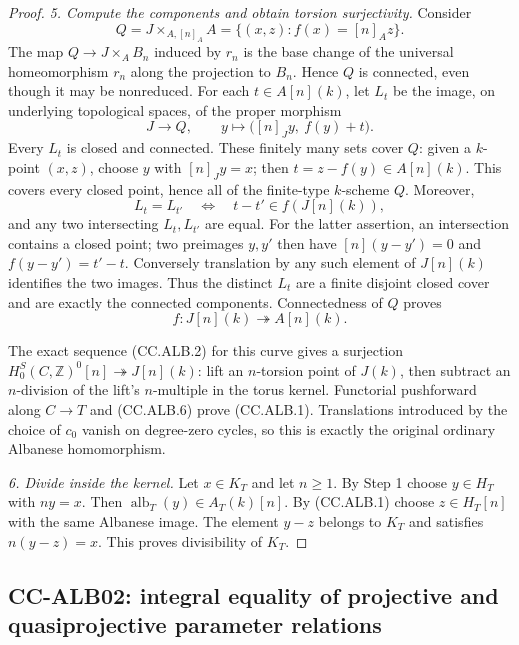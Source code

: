 \documentclass[11pt,a4paper]{article}
\theoremstyle{definition}\newtheorem{definition}[theorem]{Definition}
\theoremstyle{remark}\newtheorem{remark}[theorem]{Remark}
\begin{document}
\begin{proof}
\emph{5. Compute the components and obtain torsion
surjectivity.}
Consider
\[
 Q=J\times_{A,[n]_A}A
   =\{(x,z):f(x)=[n]_A z\}.
\]
The map $Q\to J\times_A B_n$ induced by $r_n$ is
the base change of the universal homeomorphism
$r_n$ along the projection to $B_n$.  Hence $Q$ is
connected, even though it may be nonreduced.
For each $t\in A[n](k)$, let $L_t$ be the image,
on underlying topological spaces, of the proper
morphism
\[
 J\longrightarrow Q,\qquad
 y\longmapsto\bigl([n]_J y,\ f(y)+t\bigr).           \tag{CC.ALB.4}
\]
Every $L_t$ is closed and connected.
These finitely many sets cover $Q$: given a
$k$-point $(x,z)$, choose $y$ with $[n]_J y=x$;
then $t=z-f(y)\in A[n](k)$.
This covers every closed point, hence all of the
finite-type $k$-scheme $Q$.
Moreover,
\[
 L_t=L_{t'}
 \quad\Longleftrightarrow\quad
 t-t'\in f(J[n](k)),                               \tag{CC.ALB.5}
\]
and any two intersecting $L_t,L_{t'}$ are equal.
For the latter assertion, an intersection contains
a closed point; two preimages $y,y'$ then have
$[n](y-y')=0$ and $f(y-y')=t'-t$.
Conversely translation by any such element of
$J[n](k)$ identifies the two images.
Thus the distinct $L_t$ are a finite disjoint closed
cover and are exactly the connected components.
Connectedness of $Q$ proves
\[
 f:J[n](k)\twoheadrightarrow A[n](k).               \tag{CC.ALB.6}
\]

The exact sequence (CC.ALB.2) for this curve gives a
surjection
$H^S_0(C,\mathbb Z)^0[n]\twoheadrightarrow J[n](k)$:
lift an $n$-torsion point of $J(k)$, then subtract
an $n$-division of the lift's $n$-multiple in the
torus kernel.  Functorial pushforward along $C\to T$
and (CC.ALB.6) prove (CC.ALB.1).
Translations introduced by the choice of $c_0$ vanish
on degree-zero cycles, so this is exactly the original
ordinary Albanese homomorphism.

\emph{6. Divide inside the kernel.}
Let $x\in K_T$ and let $n\geq1$.  By Step 1 choose
$y\in H_T$ with $ny=x$.
Then $\operatorname{alb}_T(y)\in A_T(k)[n]$.
By (CC.ALB.1) choose $z\in H_T[n]$ with the same
Albanese image.  The element $y-z$ belongs to $K_T$
and satisfies $n(y-z)=x$.  This proves divisibility
of $K_T$.
\end{proof}

\subsection{CC-ALB02: integral equality of projective and
quasiprojective parameter relations}
\end{document}
